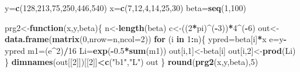 \documentclass[
]{article}
\newenvironment{Shaded}{\begin{snugshade}}{\end{snugshade}}
\newcommand{\ControlFlowTok}[1]{\textcolor[rgb]{0.13,0.29,0.53}{\textbf{#1}}}
\newcommand{\DataTypeTok}[1]{\textcolor[rgb]{0.13,0.29,0.53}{#1}}
\newcommand{\DecValTok}[1]{\textcolor[rgb]{0.00,0.00,0.81}{#1}}
\newcommand{\FloatTok}[1]{\textcolor[rgb]{0.00,0.00,0.81}{#1}}
\newcommand{\KeywordTok}[1]{\textcolor[rgb]{0.13,0.29,0.53}{\textbf{#1}}}
\newcommand{\NormalTok}[1]{#1}
\newcommand{\OperatorTok}[1]{\textcolor[rgb]{0.81,0.36,0.00}{\textbf{#1}}}
\newcommand{\StringTok}[1]{\textcolor[rgb]{0.31,0.60,0.02}{#1}}
\begin{document}
\begin{Shaded}
\begin{Highlighting}[]
\NormalTok{y=}\KeywordTok{c}\NormalTok{(}\DecValTok{128}\NormalTok{,}\DecValTok{213}\NormalTok{,}\DecValTok{75}\NormalTok{,}\DecValTok{250}\NormalTok{,}\DecValTok{446}\NormalTok{,}\DecValTok{540}\NormalTok{)}
\NormalTok{x=}\KeywordTok{c}\NormalTok{(}\DecValTok{7}\NormalTok{,}\DecValTok{12}\NormalTok{,}\DecValTok{4}\NormalTok{,}\DecValTok{14}\NormalTok{,}\DecValTok{25}\NormalTok{,}\DecValTok{30}\NormalTok{)}
\NormalTok{beta=}\KeywordTok{seq}\NormalTok{(}\DecValTok{1}\NormalTok{,}\DecValTok{100}\NormalTok{)}

\NormalTok{prg2<-}\ControlFlowTok{function}\NormalTok{(x,y,beta)\{ }
\NormalTok{  n<-}\KeywordTok{length}\NormalTok{(beta)}
\NormalTok{  c<-((}\DecValTok{2}\OperatorTok{*}\NormalTok{pi)}\OperatorTok{^}\NormalTok{(}\OperatorTok{-}\DecValTok{3}\NormalTok{))}\OperatorTok{*}\DecValTok{4}\OperatorTok{^}\NormalTok{(}\OperatorTok{-}\DecValTok{6}\NormalTok{)}
\NormalTok{  out<-}\KeywordTok{data.frame}\NormalTok{(}\KeywordTok{matrix}\NormalTok{(}\DecValTok{0}\NormalTok{,}\DataTypeTok{nrow=}\NormalTok{n,}\DataTypeTok{ncol=}\DecValTok{2}\NormalTok{))}
  \ControlFlowTok{for}\NormalTok{ (i }\ControlFlowTok{in} \DecValTok{1}\OperatorTok{:}\NormalTok{n)\{  }
\NormalTok{    ypred=beta[i]}\OperatorTok{*}\NormalTok{x}
\NormalTok{    e=y}\OperatorTok{-}\NormalTok{ypred}
\NormalTok{    m1=(e}\OperatorTok{^}\DecValTok{2}\NormalTok{)}\OperatorTok{/}\DecValTok{16}
\NormalTok{    Li=}\KeywordTok{exp}\NormalTok{(}\OperatorTok{-}\FloatTok{0.5}\OperatorTok{*}\KeywordTok{sum}\NormalTok{(m1))}
\NormalTok{    out[i,}\DecValTok{1}\NormalTok{]<-beta[i]}
\NormalTok{    out[i,}\DecValTok{2}\NormalTok{]<-}\KeywordTok{prod}\NormalTok{(Li)}
\NormalTok{  \}    }
  \KeywordTok{dimnames}\NormalTok{(out[[}\DecValTok{2}\NormalTok{]])[[}\DecValTok{2}\NormalTok{]]}\OperatorTok{<}\KeywordTok{c}\NormalTok{(}\StringTok{"b1"}\NormalTok{,}\StringTok{"L"}\NormalTok{)    }
\NormalTok{  out}
\NormalTok{  \}}
\KeywordTok{round}\NormalTok{(}\KeywordTok{prg2}\NormalTok{(x,y,beta),}\DecValTok{5}\NormalTok{)}
\end{Highlighting}
\end{Shaded}
\end{document}
